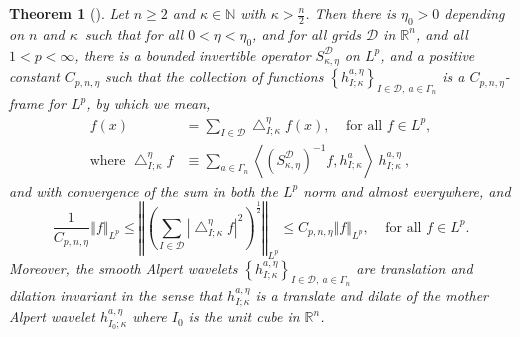 \documentclass{amsart}%
\newtheorem{theorem}{Theorem}
\theoremstyle{plain}
\numberwithin{equation}{section}
\begin{document}
\begin{theorem}
[\cite{Saw7}]\label{reproducing}Let $n\geq2$ and $\kappa\in\mathbb{N}$ with
$\kappa>\frac{n}{2}$. Then there is $\eta_{0}>0$ depending on $n$ and $\kappa
$\ such that for all $0<\eta<\eta_{0}$, and for all grids $\mathcal{D}$ in
$\mathbb{R}^{n} $, and all $1<p<\infty$, there is a bounded invertible
operator $S_{\kappa,\eta}^{\mathcal{D}}$ on $L^{p}$, and a positive constant
$C_{p,n,\eta}$ such that the collection of functions $\left\{  h_{I;\kappa
}^{a,\eta}\right\}  _{I\in\mathcal{D},\ a\in\Gamma_{n}}$ is a $C_{p,n,\eta}%
$-frame for $L^{p}$, by which we mean,%
\begin{align}
f\left(  x\right)   &  =\sum_{I\in\mathcal{D}}\bigtriangleup_{I;\kappa}^{\eta
}f\left(  x\right)  ,\ \ \ \ \ \text{for all }f\in L^{p},\label{bounded below}%
\\
\text{where }\bigtriangleup_{I;\kappa}^{\eta}f  &  \equiv\sum_{a\in\Gamma_{n}%
}\left\langle \left(  S_{\kappa,\eta}^{\mathcal{D}}\right)  ^{-1}%
f,h_{I;\kappa}^{a}\right\rangle \ h_{I;\kappa}^{a,\eta}\ ,\nonumber
\end{align}
and with convergence of the sum in both the $L^{p}$ norm and almost
everywhere, and%
\begin{equation}
\frac{1}{C_{p,n,\eta}}\left\Vert f\right\Vert _{L^{p}}\leq\left\Vert \left(
\sum_{I\in\mathcal{D}}\left\vert \bigtriangleup_{I;\kappa}^{\eta}f\right\vert
^{2}\right)  ^{\frac{1}{2}}\right\Vert _{L^{p}}\leq C_{p,n,\eta}\left\Vert
f\right\Vert _{L^{p}},\ \ \ \ \ \text{for all }f\in L^{p}.\label{square est}%
\end{equation}
Moreover, the smooth Alpert wavelets $\left\{  h_{I;\kappa}^{a,\eta}\right\}
_{I\in\mathcal{D},\ a\in\Gamma_{n}}$ are translation and dilation invariant in
the sense that $h_{I;\kappa}^{a,\eta}$ is a translate and dilate of the mother
Alpert wavelet $h_{I_{0};\kappa}^{a,\eta}$ where $I_{0}$ is the unit cube in
$\mathbb{R}^{n}$.
\end{theorem}
\end{document}
